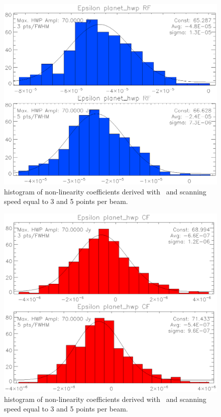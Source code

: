 \begin{figure}
	\includegraphics[clip, angle=0, width=\columnwidth]{Figures/histos_epsilon_rf.eps}
	\caption{histogram of non-linearity coefficients derived with \rf\ and scanning speed equal to 3 and 5 points per beam.}
	\label{fig:histos_epsilon_rf}
\end{figure}

\begin{figure}
	\includegraphics[clip, angle=0, width=\columnwidth]{Figures/histos_epsilon_cf.eps}
	\caption{histogram of non-linearity coefficients derived with \cf\ and scanning speed equal to 3 and 5 points per beam.}
	\label{fig:histos_epsilon_cf}
\end{figure}

